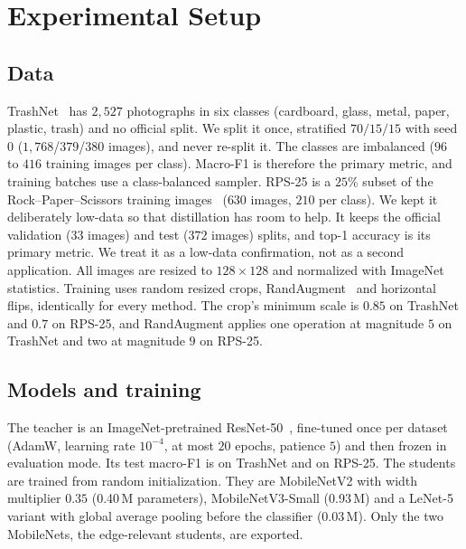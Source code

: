 \section{Experimental Setup}
\label{sec:setup}

\subsection{Data}
\label{sec:setup-data}

TrashNet~\citep{yang2016trashnet} has \(2{,}527\) photographs in six classes (cardboard, glass, metal, paper, plastic, trash) and no official split.
We split it once, stratified $70/15/15$ with seed $0$ ($1{,}768$/$379$/$380$ images), and never re-split it.
The classes are imbalanced ($96$ to $416$ training images per class). Macro-F1 is therefore the primary metric, and training batches use a class-balanced sampler.
RPS-25 is a $25\%$ subset of the Rock--Paper--Scissors training images~\citep{moroney2019rps} ($630$ images, $210$ per class). We kept it deliberately low-data so that distillation has room to help.
It keeps the official validation ($33$ images) and test ($372$ images) splits, and top-1 accuracy is its primary metric. We treat it as a low-data confirmation, not as a second application.
All images are resized to $128{\times}128$ and normalized with ImageNet statistics.
Training uses random resized crops, RandAugment~\citep{cubuk2020randaugment} and horizontal flips, identically for every method. The crop's minimum scale is $0.85$ on TrashNet and $0.7$ on RPS-25, and RandAugment applies one operation at magnitude $5$ on TrashNet and two at magnitude $9$ on RPS-25.

\subsection{Models and training}
\label{sec:setup-training}

The teacher is an ImageNet-pretrained ResNet-50~\citep{he2016deep}, fine-tuned once per dataset (AdamW, learning rate $10^{-4}$, at most $20$ epochs, patience $5$) and then frozen in evaluation mode. Its test macro-F1 is \TeacherTn{} on TrashNet and \TeacherRps{} on RPS-25.
The students are trained from random initialization. They are MobileNetV2 with width multiplier $0.35$ (0.40\,M parameters), MobileNetV3-Small (0.93\,M) and a LeNet-5 variant with global average pooling before the classifier (0.03\,M). Only the two MobileNets, the edge-relevant students, are exported.

